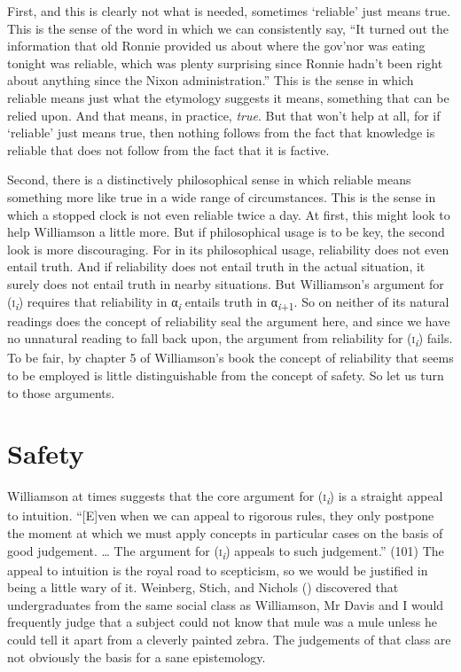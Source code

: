 \documentclass[
  11pt,
  letterpaper,
  DIV=11,
  numbers=noendperiod,
  twoside]{scrartcl}
\begin{document}
First, and this is clearly not what is needed, sometimes `reliable' just
means true. This is the sense of the word in which we can consistently
say, ``It turned out the information that old Ronnie provided us about
where the gov'nor was eating tonight was reliable, which was plenty
surprising since Ronnie hadn't been right about anything since the Nixon
administration.'' This is the sense in which reliable means just what
the etymology suggests it means, something that can be relied upon. And
that means, in practice, \emph{true}. But that won't help at all, for if
`reliable' just means true, then nothing follows from the fact that
knowledge is reliable that does not follow from the fact that it is
factive.

Second, there is a distinctively philosophical sense in which reliable
means something more like true in a wide range of circumstances. This is
the sense in which a stopped clock is not even reliable twice a day. At
first, this might look to help Williamson a little more. But if
philosophical usage is to be key, the second look is more discouraging.
For in its philosophical usage, reliability does not even entail truth.
And if reliability does not entail truth in the actual situation, it
surely does not entail truth in nearby situations. But Williamson's
argument for (\textsc{i}\textsubscript{\emph{i}}) requires that
reliability in α\textsubscript{\emph{i}} entails truth in
α\textsubscript{\emph{i}+1}. So on neither of its natural readings does
the concept of reliability seal the argument here, and since we have no
unnatural reading to fall back upon, the argument from reliability for
(\textsc{i}\textsubscript{\emph{i}}) fails. To be fair, by chapter 5 of
Williamson's book the concept of reliability that seems to be employed
is little distinguishable from the concept of safety. So let us turn to
those arguments.

\section{Safety}\label{safety}

Williamson at times suggests that the core argument for
(\textsc{i}\textsubscript{\emph{i}}) is a straight appeal to intuition.
``{[}E{]}ven when we can appeal to rigorous rules, they only postpone
the moment at which we must apply concepts in particular cases on the
basis of good judgement. \ldots{} The argument for
(\textsc{i}\textsubscript{\emph{i}}) appeals to such judgement.'' (101)
The appeal to intuition is the royal road to scepticism, so we would be
justified in being a little wary of it. Weinberg, Stich, and Nichols
() discovered that undergraduates from
the same social class as Williamson, Mr Davis and I would frequently
judge that a subject could not know that mule was a mule unless he could
tell it apart from a cleverly painted zebra. The judgements of that
class are not obviously the basis for a sane epistemology.
\end{document}
